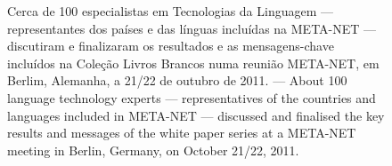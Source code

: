 \renewcommand*{\figureformat}{}
\renewcommand*{\captionformat}{}

\begin{figure}[htbp]
  \center
  \caption{Cerca de 100 especialistas em Tecnologias da Linguagem --- representantes dos países e das línguas incluídas na META-NET --- discutiram e finalizaram os resultados e as mensagens-chave incluídos na Coleção Livros Brancos numa reunião META-NET, em Berlim, Alemanha, a 21/22 de ou\-tu\-bro de 2011. --- \textcolor{grey1}{About 100 language technology experts --- representatives of the countries and languages included in META-NET --- discussed and finalised the key results and messages of the white paper  series at a META-NET meeting in Berlin, Germany, on October 21/22, 2011.}}
  \medskip
\end{figure}

\cleardoublepage

\label{whitepaperseries}

